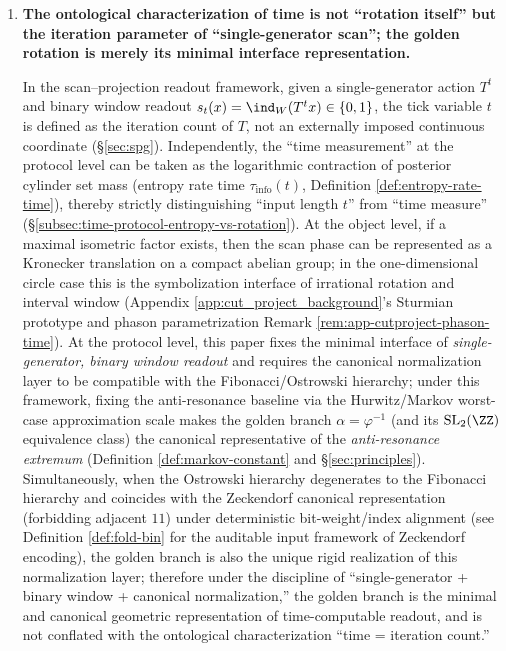 \begin{enumerate}
  \item \textbf{The ontological characterization of time is not ``rotation itself'' but the iteration parameter of ``single-generator scan''; the golden rotation is merely its minimal interface representation.}

  \begin{theorem}
  \label{thm:terminal-time-protocol-golden-branch}
  In the scan--projection readout framework, given a single-generator action \(T^t\) and binary window readout
  \(s_t(x)=\ind_W(T^t x)\in\{0,1\}\), the tick variable \(t\) is defined as the iteration count of \(T\), not an externally imposed continuous coordinate (\S\ref{sec:spg}).
  Independently, the ``time measurement'' at the protocol level can be taken as the logarithmic contraction of posterior cylinder set mass (entropy rate time \(\tau_{\mathrm{info}}(t)\), Definition \ref{def:entropy-rate-time}), thereby strictly distinguishing ``input length \(t\)'' from ``time measure'' (\S\ref{subsec:time-protocol-entropy-vs-rotation}).
  At the object level, if a maximal isometric factor exists, then the scan phase can be represented as a Kronecker translation on a compact abelian group; in the one-dimensional circle case this is the symbolization interface of irrational rotation and interval window (Appendix \ref{app:cut_project_background}'s Sturmian prototype and phason parametrization Remark \ref{rem:app-cutproject-phason-time}).
  At the protocol level, this paper fixes the minimal interface of \emph{single-generator, binary window readout} and requires the canonical normalization layer to be compatible with the Fibonacci/Ostrowski hierarchy; under this framework, fixing the anti-resonance baseline via the Hurwitz/Markov worst-case approximation scale makes the golden branch \(\alpha=\varphi^{-1}\) (and its \(\mathrm{SL}_2(\ZZ)\) equivalence class) the canonical representative of the \emph{anti-resonance extremum} (Definition \ref{def:markov-constant} and \S\ref{sec:principles}).
  Simultaneously, when the Ostrowski hierarchy degenerates to the Fibonacci hierarchy and coincides with the Zeckendorf canonical representation (forbidding adjacent \(11\)) under deterministic bit-weight/index alignment (see Definition \ref{def:fold-bin} for the auditable input framework of Zeckendorf encoding), the golden branch is also the unique rigid realization of this normalization layer; therefore under the discipline of ``single-generator + binary window + canonical normalization,'' the golden branch is the minimal and canonical geometric representation of time-computable readout, and is not conflated with the ontological characterization ``time = iteration count.''
  \end{theorem}


\end{enumerate}
